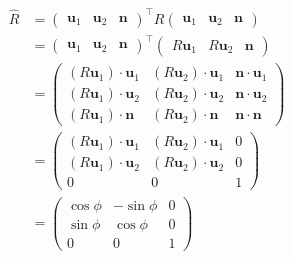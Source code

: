\documentclass[12pt]{article}
\begin{document}
\begin{equation}
    \begin{split}
        \hat{R}
        &=
        \begin{pmatrix}
            \mathbf{u}_{1} & \mathbf{u}_{2} & \mathbf{n}
        \end{pmatrix}^{\intercal}
        R
        \begin{pmatrix}
            \mathbf{u}_{1} & \mathbf{u}_{2} & \mathbf{n}
        \end{pmatrix} \\
        &=
        \begin{pmatrix}
            \mathbf{u}_{1} & \mathbf{u}_{2} & \mathbf{n}
        \end{pmatrix}^{\intercal}
        \begin{pmatrix}
            R\mathbf{u}_{1} & R\mathbf{u}_{2} & \mathbf{n}
        \end{pmatrix} \\
        &=
        \begin{pmatrix}
            (R \mathbf{u}_{1}) \cdot \mathbf{u}_{1} & (R \mathbf{u}_{2}) \cdot \mathbf{u}_{1} & \mathbf{n} \cdot \mathbf{u}_{1} \\
            (R \mathbf{u}_{1}) \cdot \mathbf{u}_{2} & (R \mathbf{u}_{2}) \cdot \mathbf{u}_{2} & \mathbf{n} \cdot \mathbf{u}_{2} \\
            (R \mathbf{u}_{1}) \cdot \mathbf{n}     & (R \mathbf{u}_{2}) \cdot \mathbf{n}     & \mathbf{n} \cdot \mathbf{n}
        \end{pmatrix} \\
        &=
        \begin{pmatrix}
            (R \mathbf{u}_{1}) \cdot \mathbf{u}_{1} & (R \mathbf{u}_{2}) \cdot \mathbf{u}_{1} & 0 \\
            (R \mathbf{u}_{1}) \cdot \mathbf{u}_{2} & (R \mathbf{u}_{2}) \cdot \mathbf{u}_{2} & 0 \\
            0                                       & 0                                       & 1
        \end{pmatrix} \\
        &=
        \begin{pmatrix}
            \cos{\phi} & -\sin{\phi} & 0 \\
            \sin{\phi} & \cos{\phi}  & 0 \\
            0          & 0           & 1
        \end{pmatrix}
    \end{split}
\end{equation}
\end{document}
